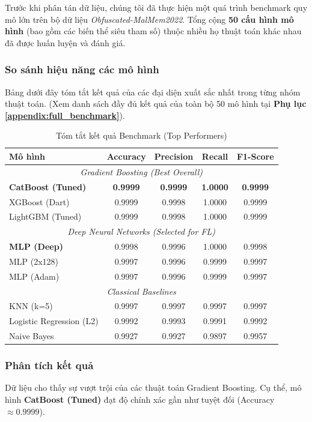 Trước khi phân tán dữ liệu, chúng tôi đã thực hiện một quá trình benchmark quy mô lớn trên bộ dữ liệu \textit{Obfuscated-MalMem2022}. Tổng cộng \textbf{50 cấu hình mô hình} (bao gồm các biến thể siêu tham số) thuộc nhiều họ thuật toán khác nhau đã được huấn luyện và đánh giá.

\subsubsection{So sánh hiệu năng các mô hình}
Bảng dưới đây tóm tắt kết quả của các đại diện xuất sắc nhất trong từng nhóm thuật toán. (Xem danh sách đầy đủ kết quả của toàn bộ 50 mô hình tại \textbf{Phụ lục \ref{appendix:full_benchmark}}).

\begin{table}[ht!]
\centering
\caption{Tóm tắt kết quả Benchmark (Top Performers)}
\label{tab:benchmark_summary}
\begin{tabular}{|l|c|c|c|c|}
\hline
\textbf{Mô hình} & \textbf{Accuracy} & \textbf{Precision} & \textbf{Recall} & \textbf{F1-Score} \\ \hline
\multicolumn{5}{|c|}{\textit{Gradient Boosting (Best Overall)}} \\ \hline
\textbf{CatBoost (Tuned)} & \textbf{0.9999} & \textbf{0.9999} & \textbf{1.0000} & \textbf{0.9999} \\ 
XGBoost (Dart) & 0.9999 & 0.9998 & 1.0000 & 0.9999 \\ 
LightGBM (Tuned) & 0.9999 & 0.9998 & 1.0000 & 0.9999 \\ \hline
\multicolumn{5}{|c|}{\textit{Deep Neural Networks (Selected for FL)}} \\ \hline
\textbf{MLP (Deep)} & 0.9998 & 0.9996 & 1.0000 & 0.9998 \\ 
MLP (2x128) & 0.9997 & 0.9996 & 0.9999 & 0.9997 \\ 
MLP (Adam) & 0.9997 & 0.9996 & 0.9999 & 0.9997 \\ \hline
\multicolumn{5}{|c|}{\textit{Classical Baselines}} \\ \hline
KNN (k=5) & 0.9997 & 0.9997 & 0.9997 & 0.9997 \\ 
Logistic Regression (L2) & 0.9992 & 0.9993 & 0.9991 & 0.9992 \\ 
Naive Bayes & 0.9927 & 0.9927 & 0.9897 & 0.9957 \\ \hline
\end{tabular}
\end{table}



\subsubsection{Phân tích kết quả}
Dữ liệu cho thấy sự vượt trội của các thuật toán Gradient Boosting. Cụ thể, mô hình \textbf{CatBoost (Tuned)} đạt độ chính xác gần như tuyệt đối (Accuracy $\approx 0.9999$).

